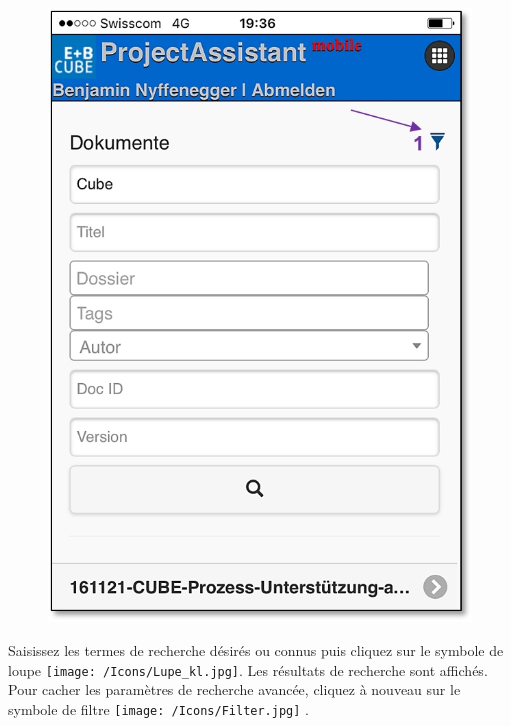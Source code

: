\begin{figure}   %
  \vspace{-35pt}      %
  \begin{center}
    \includegraphics[width=1\linewidth]{../chapters/11_Dokumentenablage/pictures/11-mob05_Filterverwenden.jpg}
  \end{center}
  \vspace{-20pt}
  \vspace{-10pt}
\end{figure}

Saisissez les termes de recherche désirés ou connus puis cliquez sur le symbole de loupe \texttt{[image: /Icons/Lupe\_kl.jpg]}. Les résultats de recherche sont affichés. Pour cacher les paramètres de recherche avancée, cliquez à nouveau sur le symbole de filtre \texttt{[image: /Icons/Filter.jpg]} .


